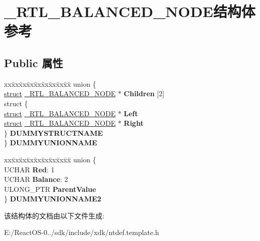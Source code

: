 \hypertarget{struct___r_t_l___b_a_l_a_n_c_e_d___n_o_d_e}{}\section{\+\_\+\+R\+T\+L\+\_\+\+B\+A\+L\+A\+N\+C\+E\+D\+\_\+\+N\+O\+D\+E结构体 参考}
\label{struct___r_t_l___b_a_l_a_n_c_e_d___n_o_d_e}
\subsection*{Public 属性}
\begin{DoxyCompactItemize}
\item 
\mbox{\label{struct___r_t_l___b_a_l_a_n_c_e_d___n_o_d_e_a2f7fe716b6653dd84205d51d92e1dbc6}} 
\begin{tabbing}
xx\=xx\=xx\=xx\=xx\=xx\=xx\=xx\=xx\=\kill
union \{\\
\>\hyperlink{interfacestruct}{struct} \hyperlink{struct___r_t_l___b_a_l_a_n_c_e_d___n_o_d_e}{\_RTL\_BALANCED\_NODE} $\ast$ {\bfseries Children} \mbox{[}2\mbox{]}\\
\>struct \{\\
\>\>\hyperlink{interfacestruct}{struct} \hyperlink{struct___r_t_l___b_a_l_a_n_c_e_d___n_o_d_e}{\_RTL\_BALANCED\_NODE} $\ast$ {\bfseries Left}\\
\>\>\hyperlink{interfacestruct}{struct} \hyperlink{struct___r_t_l___b_a_l_a_n_c_e_d___n_o_d_e}{\_RTL\_BALANCED\_NODE} $\ast$ {\bfseries Right}\\
\>\} {\bfseries DUMMYSTRUCTNAME}\\
\} {\bfseries DUMMYUNIONNAME}\\

\end{tabbing}\item 
\mbox{\label{struct___r_t_l___b_a_l_a_n_c_e_d___n_o_d_e_a887706b89ad1f72f8016d8d3e5bd2ced}} 
\begin{tabbing}
xx\=xx\=xx\=xx\=xx\=xx\=xx\=xx\=xx\=\kill
union \{\\
\>UCHAR {\bfseries Red}: 1\\
\>UCHAR {\bfseries Balance}: 2\\
\>ULONG\_PTR {\bfseries ParentValue}\\
\} {\bfseries DUMMYUNIONNAME2}\\

\end{tabbing}\end{DoxyCompactItemize}


该结构体的文档由以下文件生成\+:\begin{DoxyCompactItemize}
\item 
E\+:/\+React\+O\+S-\/0../sdk/include/xdk/ntdef.\+template.\+h\end{DoxyCompactItemize}
